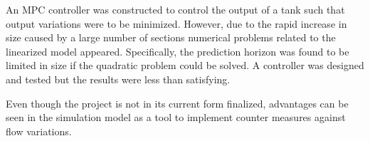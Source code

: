 
An MPC controller was constructed to control the output of a tank such that output variations were to be minimized. However, due to the rapid increase in size caused by a large number of sections numerical problems related to the linearized model appeared. Specifically, the prediction horizon was found to be limited in size if the quadratic problem could be solved.
A controller was designed and tested but the results were less than satisfying.


Even though the project is not in its current form finalized, advantages can be seen in the simulation model as a tool to implement counter measures against flow variations. 





